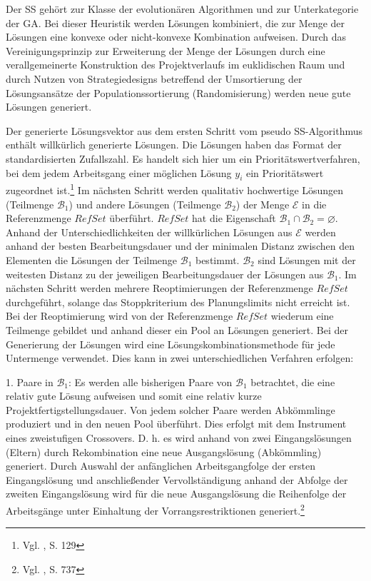 \documentclass[a4paper,12pt,normalheadings,footexclude,headinclude,liststotoc,nochapterprefix,onecolumn,oneside,parskip,pointlessnumbers]{scrreprt}
\begin{document}
Der SS gehört zur Klasse der evolutionären Algorithmen und zur Unterkategorie der GA. Bei dieser Heuristik werden Lösungen kombiniert, die zur Menge der Lösungen eine konvexe oder nicht-konvexe Kombination aufweisen. Durch das Vereinigungsprinzip zur Erweiterung der Menge der Lösungen durch eine verallgemeinerte Konstruktion des Projektverlaufs im euklidischen Raum und durch Nutzen von Strategiedesigns betreffend der Umsortierung der Lösungsansätze der Populationssortierung (Randomisierung) werden neue gute Lösungen generiert.%

Der generierte Lösungsvektor aus dem ersten Schritt vom pseudo SS-Algo\-rith\-mus enthält willkürlich generierte Lösungen. Die Lösungen haben das Format der standardisierten Zufallszahl. Es handelt sich hier um ein Prioritätswertverfahren, bei dem jedem Arbeitsgang einer möglichen Lösung $y_{i}$ ein Prioritätswert zugeordnet ist.\footnote{Vgl. \cite{domschke2005einfuhrung}, S. 129}  
Im nächsten Schritt werden qualitativ hochwertige Lösungen (Teilmenge $\mathcal{B}_{1}$) und andere Lösungen (Teilmenge $\mathcal{B}_{2}$) der Menge $\mathcal{E}$ in die Referenzmenge $RefSet$ überführt. $RefSet$ hat die Eigenschaft  $\mathcal{B}_{1}\cap \mathcal{B}_{2}=\varnothing$. Anhand der Unterschiedlichkeiten der willkürlichen Lösungen aus $\mathcal{E}$ werden anhand der besten Bearbeitungsdauer und der minimalen Distanz zwischen den Elementen die Lösungen der Teilmenge $\mathcal{B}_{1}$ bestimmt. $\mathcal{B}_{2}$ sind Lösungen mit der weitesten Distanz zu der jeweiligen Bearbeitungsdauer der Lösungen aus $\mathcal{B}_{1}$. Im nächsten Schritt werden mehrere Reoptimierungen der Referenzmenge $RefSet$ durchgeführt, solange das Stoppkriterium des Planungslimits nicht erreicht ist.
Bei der Reoptimierung wird von der Referenzmenge $RefSet$ wiederum eine Teilmenge gebildet und anhand dieser ein Pool an Lösungen generiert. Bei der Generierung der Lösungen wird eine Lösungskombinationsmethode für jede Untermenge verwendet. Dies kann in zwei unterschiedlichen Verfahren erfolgen:

1. Paare in $\mathcal{B}_{1}$: Es werden alle bisherigen Paare von $\mathcal{B}_{1}$ betrachtet, die eine relativ gute Lösung aufweisen und somit eine relativ kurze Projektfertigstellungsdauer. Von jedem solcher Paare werden Abkömmlinge produziert und in den neuen Pool überführt. Dies erfolgt mit dem Instrument eines zweistufigen Crossovers. D. h. es wird anhand von zwei Eingangslösungen (Eltern) durch Rekombination eine neue Ausgangslösung (Abkömmling) generiert. Durch Auswahl der anfänglichen Arbeitsgangfolge der ersten Eingangslösung und anschließender Vervollständigung anhand der Abfolge der zweiten Eingangslösung wird für die neue Ausgangslösung die Reihenfolge der Arbeitsgänge unter Einhaltung der Vorrangsrestriktionen generiert.\footnote{Vgl. \cite{hartmann1998competitive}, S. 737} %
\end{document}
